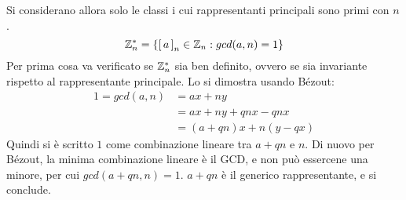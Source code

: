 Si considerano allora solo le classi i cui rappresentanti principali sono primi con $n$.
\begin{equation*}
    \mathbb{Z}_{n}^{*}
    =
    \left\{ 
        \left[\,a\,\right]_{n} 
        \in \mathbb{Z}_{n} 
        :
        gcd(a, n) = 1
    \right\}
\end{equation*}
Per prima cosa va verificato se $
\mathbb{Z}_{n}^{*} 
$ sia ben definito, ovvero se sia invariante rispetto al rappresentante principale.
Lo si dimostra usando Bézout:
\begin{align*}
    1 = 
    gcd(a, n)
    &
    = 
    ax + ny
    \\
    &
    = 
    ax + ny + qnx - qnx
    \\
    &
    = 
    \left( a + qn \right) x
    +
    n \left( y - qx \right)
\end{align*}
Quindi si è scritto $1$ come combinazione lineare tra $
a + qn
$ e $n$. Di nuovo per Bézout, la minima combinazione lineare è il GCD, e non può essercene una minore, per cui $
    gcd(a + qn, n) = 1
$. $
a + qn
$ è il generico rappresentante, e si conclude.

